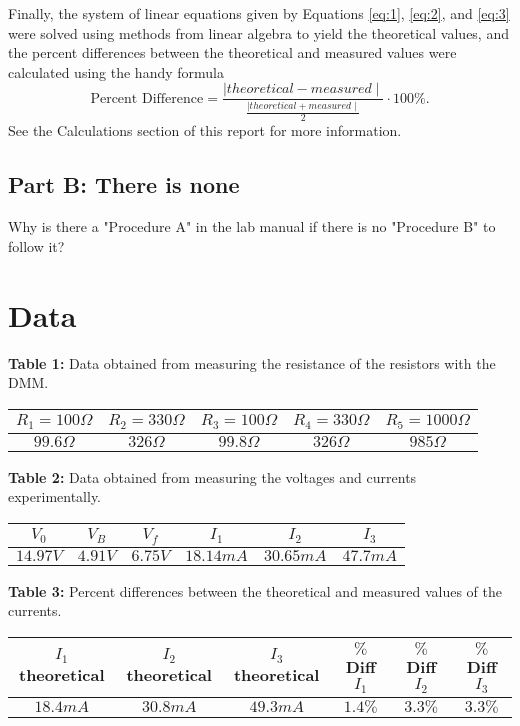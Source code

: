 \documentclass{article}
\begin{document}
Finally, the system of linear equations given by Equations \ref{eq:1}, \ref{eq:2}, and \ref{eq:3} were solved using methods from linear algebra to yield the theoretical values, and
the percent differences between the theoretical and measured values were calculated using the handy formula
\begin{equation}\label{eq:6}
    \text{Percent Difference} = \frac{\mid \!theoretical - measured \mid}{\frac{\mid theoretical + measured \mid}{2}} \cdot 100\%.
\end{equation}
See the Calculations section of this report for more information. 
\subsection*{Part B: There is none}
Why is there a "Procedure A" in the lab manual if there is no "Procedure B" to follow it?
\section{Data}
\renewcommand{\arraystretch}{1.5}
\renewcommand{\tabcolsep}{0.2cm}
\textbf{Table 1:} Data obtained from measuring the resistance of the resistors with the DMM. 
\begin{center}
    \begin{tabular}{|c|c|c|c|c|}
        \hline
        $R_1 = 100\Omega$ & $R_2 = 330\Omega$ & $R_3 = 100\Omega$ & $R_4 = 330\Omega$ & $R_5 = 1000\Omega$\\ 
        \hline
        $99.6\Omega$ & $326\Omega$ & $99.8\Omega$ & $326\Omega$ & $985\Omega$\\
        \hline
    \end{tabular}
\end{center}
\vspace{2cm}
\textbf{Table 2:} Data obtained from measuring the voltages and currents experimentally.
\begin{center}
    \begin{tabular}{|c|c|c|c|c|c|}
        \hline
        $V_0$ & $V_B$ & $V_f$ & $I_1$ & $I_2$ & $I_3$\\ 
        \hline
        $14.97 V$ & $4.91 V$ & $6.75 V$ & $18.14 mA$ & $30.65 mA$ & $47.7 mA$ \\
        \hline
    \end{tabular}
\end{center}
\vspace{0.2cm}
\textbf{Table 3:} Percent differences between the theoretical and measured values of the currents.
\begin{center}
    \begin{tabular}{|c|c|c|c|c|c|}
        \hline
        $I_1$ theoretical & $I_2$ theoretical & $I_3$ theoretical & $\%$ Diff $I_1$ & $\%$ Diff $I_2$ & $\%$ Diff $I_3$\\ 
        \hline
        $18.4 mA$ & $30.8mA$ & $49.3mA$ & $1.4\%$ & $3.3\%$ & $3.3\%$ \\
        \hline
    \end{tabular}
\end{center}
\end{document}
